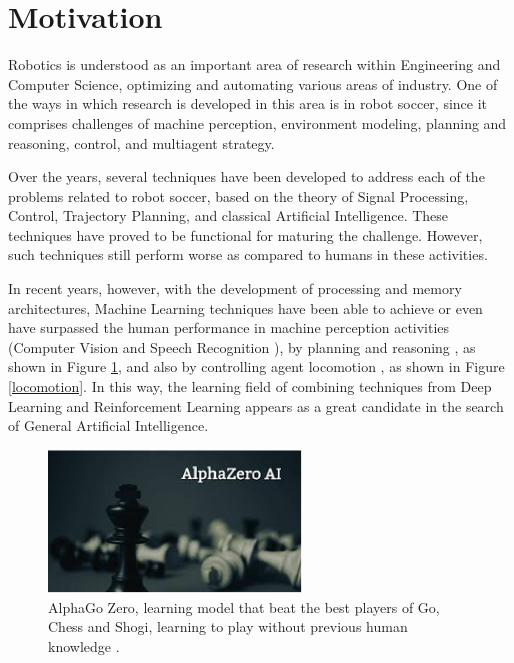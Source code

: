 \section{Motivation}

Robotics is understood as an important area of research within Engineering and Computer Science, optimizing and automating various areas of industry. One of the ways in which research is developed in this area is in robot soccer, since it comprises challenges of machine perception, environment modeling, planning and reasoning, control, and multiagent strategy.

Over the years, several techniques have been developed to address each of the problems related to robot soccer, based on the theory of Signal Processing, Control, Trajectory Planning, and classical Artificial Intelligence. These techniques have proved to be functional for maturing the challenge. However, such techniques still perform worse as compared to humans in these activities.

In recent years, however, with the development of processing and memory architectures, Machine Learning techniques have been able to achieve or even have surpassed the human performance in machine perception activities (Computer Vision \cite{DBLP:journals/corr/LuT14} and Speech Recognition \cite{DBLP:journals/corr/XiongDHSSSYZ16a}), by planning and reasoning \cite{DBLP:journals/corr/abs-1712-01815}, as shown in Figure \ref{alphazero}, and also by controlling agent locomotion \cite{DBLP:journals/corr/HeessTSLMWTEWER17}, as shown in Figure \ref{locomotion}. In this way, the learning field of combining techniques from Deep Learning and Reinforcement Learning appears as a great candidate in the search of General Artificial Intelligence.


\begin{figure}[ht]
\centering
\includegraphics[width=0.6\textwidth]{Cap1/AlphaZero}
\caption{AlphaGo Zero, learning model that beat the best players of Go, Chess and Shogi, learning to play without previous human knowledge \cite{DBLP:journals/corr/abs-1712-01815}.}
\label{alphazero}
\end{figure}



